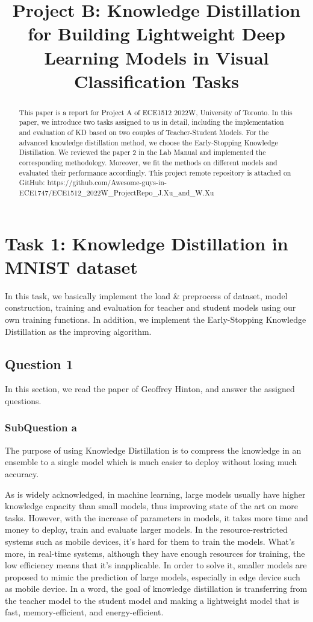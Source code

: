 \documentclass[conference]{IEEEtran}
\begin{document}
\title{Project B: Knowledge Distillation for Building Lightweight Deep Learning Models in Visual Classification Tasks
}
\maketitle

\begin{abstract}
This paper is a report for Project A of ECE1512 2022W, University of Toronto.
In this paper, we introduce two tasks assigned to us in detail, including the implementation and evaluation of KD based on two couples of Teacher-Student Models.
For the advanced knowledge distillation method, we choose the Early-Stopping Knowledge Distillation. We reviewed the paper 2 in the Lab Manual and implemented the corresponding methodology. Moreover, we fit the methods on different models and evaluated their performance accordingly. This project remote repository is attached on GitHub: https://github.com/Awesome-guys-in-ECE1747/ECE1512\_2022W\_ProjectRepo\_J.Xu\_and\_W.Xu
\end{abstract}

\section{Task 1: Knowledge Distillation in MNIST dataset}
In this task, we basically implement the load \& preprocess of dataset, model construction, training and evaluation for teacher and student models using our own training functions.
In addition, we implement the Early-Stopping Knowledge Distillation as the improving algorithm.
\subsection{Question 1}

In this section, we read the paper of Geoffrey Hinton\cite{b6}, and answer the assigned questions.

\subsubsection{SubQuestion a}
The purpose of using Knowledge Distillation is to compress the knowledge in an ensemble to a single model which is much easier to deploy without losing much accuracy.\par
As is widely acknowledged, in machine learning, large models usually have higher knowledge capacity than small models, thus improving state of the art on more tasks. 
However, with the increase of parameters in models, it takes more time and money to deploy, train and evaluate larger models.
In the resource-restricted systems such as mobile devices, it's hard for them to train the models. What's more, in real-time systems, although they have enough resources for training, the low efficiency means that it's inapplicable.
In order to solve it, smaller models are proposed to mimic the prediction of large models, especially in edge device such as mobile device. In a word, the goal of knowledge distillation is transferring from the teacher model to the student model and making a lightweight model that is fast, memory-efficient, and energy-efficient.
\end{document}
